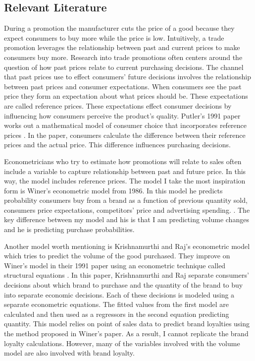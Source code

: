 \documentclass{article}
\begin{document}
\subsection{Relevant Literature}

During a promotion the manufacturer cuts the price of a good because they expect consumers to buy more while the price is low. Intuitively, a trade promotion leverages the relationship between past and current prices to make consumers buy more. Research into trade promotions often centers around the question of how past prices relate to current purchasing decisions. 
The channel that past prices use to effect consumers' future decisions involves the relationship between past prices and consumer expectations. When consumers see the past price they form an expectation about what prices should be. These expectations are called reference prices. These expectations effect consumer decisions by influencing how consumers perceive the product's quality. Putler's 1991 paper works out a mathematical model of consumer choice that incorporates reference prices \cite{putler}. In the paper, consumers calculate the difference between their reference prices and the actual price. This difference influences purchasing decisions.

Econometricians who try to estimate how promotions will relate to sales often include a variable to capture relationship between past and future price. In this way, the model includes reference prices. The model I take the most inspiration form is Winer's econometric model from 1986. In this model he predicts probability consumers buy from a brand as a function of previous quantity sold, consumers price expectations, competitors' price and advertising spending.  \cite{winer}. The key difference between my model and his is that I am predicting volume changes and he is predicting purchase probabilities.

Another model worth mentioning is Krishnamurthi and Raj's econometric model which tries to predict the volume of the good purchased. They improve on Winer's model in their 1991 paper using an econometric technique called structural equations \cite{krishnamurthi}.  In this paper, Krishnamurthi and Raj separate consumers' decisions about which brand to purchase and the quantity of the brand to buy into separate economic decisions. Each of these decisions is modeled using a separate econometric equations. The fitted values from the first model are calculated and then used as a regressors in the second equation predicting quantity. This model relies on point of sales data to predict brand loyalties using the method proposed in Winer's paper. As a result, I cannot replicate the brand loyalty calculations. However, many of the variables involved with the volume model are also involved with brand loyalty.
\end{document}
